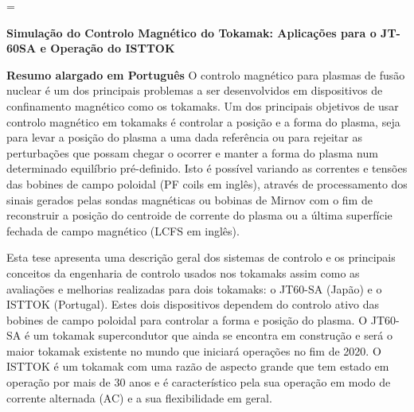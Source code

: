 





\usepackage{enumitem}
\usepackage{notoccite}
\usepackage{longtable}
\usepackage{multirow}
\usepackage{lipsum}
\usepackage{xcolor,colortbl}
\usepackage{mathtools}

\DeclareMathOperator*{\argmin}{arg\,min}
\DeclareMathOperator{\dist}{\mathit{dist}}


	\emergencystretch=\maxdimen
	
	{\fontsize{12}{12}\selectfont \textbf{ Simulação do Controlo Magnético do Tokamak: Aplicações para o JT-60SA e Operação do ISTTOK}}
	
\medskip

\setlength{\parskip}{1em}

	
	\textbf{Resumo alargado em Português}
	\smallskip
O controlo magnético para  plasmas de fusão nuclear é um dos principais problemas a ser desenvolvidos em dispositivos de confinamento magnético como os tokamaks. Um dos principais objetivos de usar controlo magnético em tokamaks é controlar a posição e a forma do plasma, seja para levar a posição do plasma a uma dada referência ou para rejeitar as perturbações que possam chegar o ocorrer e manter a forma do plasma num determinado equilíbrio pré-definido. Isto é possível variando as correntes e tensões das bobines de campo poloidal  (PF coils em inglês), através de processamento dos sinais gerados pelas sondas magnéticas ou bobinas de Mirnov com o fim de reconstruir a posição do centroide de corrente do plasma ou a última superfície fechada de campo magnético (LCFS em inglês).\smallskip

Esta tese apresenta  uma descrição geral dos sistemas de controlo e os principais conceitos da engenharia de controlo usados nos tokamaks assim como as avaliações e melhorias realizadas para dois tokamaks: o JT60-SA (Japão) e o ISTTOK (Portugal). Estes dois dispositivos dependem do controlo ativo das bobines de campo poloidal para controlar a forma e posição do plasma. O JT60-SA é um tokamak supercondutor que ainda se encontra em construção e será o maior tokamak existente no mundo que iniciará operações no fim de 2020. O ISTTOK é um tokamak com uma razão de aspecto grande que tem estado em operação por mais de 30 anos e é característico pela sua operação em modo de corrente alternada (AC) e a sua flexibilidade em geral.\smallskip

